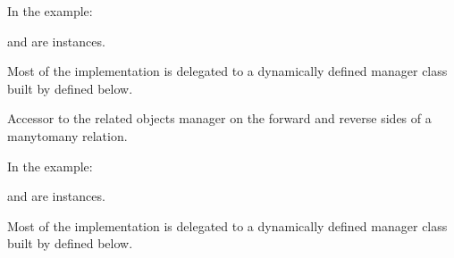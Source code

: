 \documentclass[letterpaper,10pt,english]{sphinxmanual}
\begin{document}
\begin{fulllineitems}
\begin{fulllineitems}
\sphinxAtStartPar
In the example:

\begin{sphinxVerbatim}[commandchars=\\\{\}]
 
       
\end{sphinxVerbatim}

\sphinxAtStartPar
{} and  are 
instances.

\sphinxAtStartPar
Most of the implementation is delegated to a dynamically defined manager
class built by  defined below.

\end{fulllineitems}


\begin{fulllineitems}
\label{\detokenize{app:app.models.modele_io_mapping.links}}
\pysigstartsignatures
{}
\pysigstopsignatures
\sphinxAtStartPar
Accessor to the related objects manager on the forward and reverse sides of
a many\sphinxhyphen{}to\sphinxhyphen{}many relation.

\sphinxAtStartPar
In the example:

\begin{sphinxVerbatim}[commandchars=\\\{\}]
 
       
\end{sphinxVerbatim}

\sphinxAtStartPar
{} and  are 
instances.

\sphinxAtStartPar
Most of the implementation is delegated to a dynamically defined manager
class built by  defined below.


\end{fulllineitems}
\end{fulllineitems}
\end{document}
